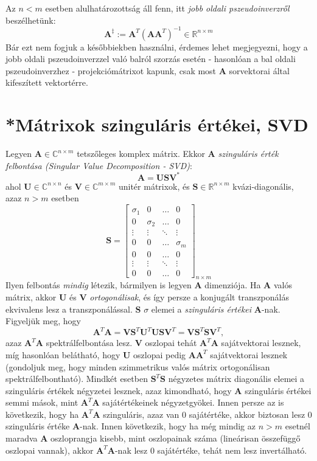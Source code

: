 \documentclass[14p]{report}
\def\pmb{\boldsymbol}
\begin{document}
	Az $n < m$ esetben alulhatározottság áll fenn, itt \emph{jobb oldali pszeudoinverzről} beszélhetünk:
	\[
	\pmb{A}^{\ddagger} := \pmb{A}^T(\pmb{A}\pmb{A}^T)^{-1} \in \mathbb{R}^{n \times m}
	\]
	Bár ezt nem fogjuk a későbbiekben használni, érdemes lehet megjegyezni, hogy a jobb oldali pszeudoinverzzel való balról szorzás esetén - hasonlóan a bal oldali pszeudoinverzhez - projekciómátrixot kapunk, csak most $\pmb{A}$ sorvektorai által kifeszített vektortérre.
	
	\section{*Mátrixok szinguláris értékei, SVD}
	Legyen $\pmb{A} \in \mathbb{C}^{n \times m}$ tetszőleges komplex mátrix. Ekkor $\pmb{A}$ \emph{szinguláris érték felbontása (Singular Value Decomposition - SVD)}:
	\[
		\pmb{A} = \pmb{U}\pmb{S}\pmb{V}^*
	\]
	ahol $\pmb{U} \in \mathbb{C}^{n \times n}$ és $\pmb{V} \in \mathbb{C}^{m \times m}$ unitér mátrixok, és $\pmb{S} \in \mathbb{R}^{n \times m}$ kvázi-diagonális, azaz $n > m$ esetben
	\[
		\pmb{S} =
		\begin{bmatrix}
		\sigma_1 & 0 & \dots & 0 \\
		0 & \sigma_2 & \dots & 0 \\
		\vdots & \vdots & \ddots & \vdots \\
		0 & 0 & \dots & \sigma_m \\
		0 & 0 & \dots & 0 \\
		\vdots & \vdots & \ddots & \vdots \\
		0 & 0 & \dots & 0
		\end{bmatrix}_{n \times m}
	\]
	Ilyen felbontás \emph{mindig} létezik, bármilyen is legyen $\pmb{A}$ dimenziója. Ha $\pmb{A}$ valós mátrix, akkor $\pmb{U}$ és $\pmb{V}$ \emph{ortogonálisak}, és így persze a konjugált transzponálás ekvivalens lesz a transzponálással. $\pmb{S}$ $\sigma$ elemei a \emph{szinguláris értékei} $\pmb{A}$-nak. Figyeljük meg, hogy
	\[
		\pmb{A}^T\pmb{A} = \pmb{V}\pmb{S}^T\pmb{U}^T\pmb{U}\pmb{S}\pmb{V}^T = \pmb{V}\pmb{S}^T\pmb{S}\pmb{V}^T,
	\]
	azaz $\pmb{A}^T\pmb{A}$ spektrálfelbontása lesz. $\pmb{V}$ oszlopai tehát $\pmb{A}^T\pmb{A}$ sajátvektorai lesznek, míg hasonlóan belátható, hogy $\pmb{U}$ oszlopai pedig $\pmb{A}\pmb{A}^T$ sajátvektorai lesznek (gondoljuk meg, hogy minden szimmetrikus valós mátrix ortogonálisan spektrálfelbontható). Mindkét esetben $\pmb{S}^T\pmb{S}$ négyzetes mátrix diagonális elemei a szinguláris értékek négyzetei lesznek, azaz kimondható, hogy $\pmb{A}$ szinguláris értékei semmi mások, mint $\pmb{A}^T\pmb{A}$ sajátértékeinek négyzetgyökei. Innen persze az is következik, hogy ha $\pmb{A}^T\pmb{A}$ szinguláris, azaz van $0$ sajátértéke, akkor biztosan lesz $0$ szinguláris értéke $\pmb{A}$-nak. Innen következik, hogy ha még mindig az $n > m$ esetnél maradva $\pmb{A}$ oszloprangja kisebb, mint oszlopainak száma (lineárisan összefüggő oszlopai vannak), akkor $\pmb{A}^T\pmb{A}$-nak lesz $0$ sajátértéke, tehát nem lesz invertálható.
\end{document}
